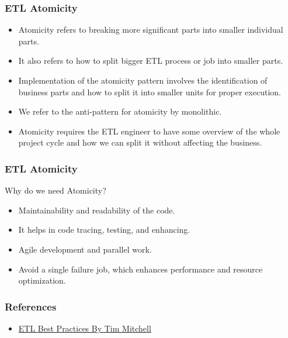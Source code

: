\begin{frame}
	\frametitle{ETL Atomicity}
	\begin{itemize}
		\item Atomicity refers to breaking more significant parts into smaller individual parts.
		\item It also refers to how to split bigger ETL process or job into smaller parts.
		\item Implementation of the atomicity pattern involves the identification of business parts and how to split it into smaller units for proper execution.
		\item We refer to the anti-pattern for atomicity by monolithic.
		\item Atomicity requires the ETL engineer to have some overview of the whole project cycle and how we can split it without affecting the business.
	\end{itemize}
\end{frame}
\begin{frame}
	\frametitle{ETL Atomicity}
	Why do we need Atomicity?
	\begin{itemize}
		\item Maintainability and readability of the code.
		\item It helps in code tracing, testing, and enhancing.
		\item Agile development and parallel work.
		\item Avoid a single failure job, which enhances performance and resource optimization.
	\end{itemize}
\end{frame}




\begin{frame}
	\frametitle{References}
	\begin{itemize}
		\item \href{https://www.timmitchell.net/etl-best-practices/}{ETL Best Practices By Tim Mitchell}
	\end{itemize}

\end{frame}





